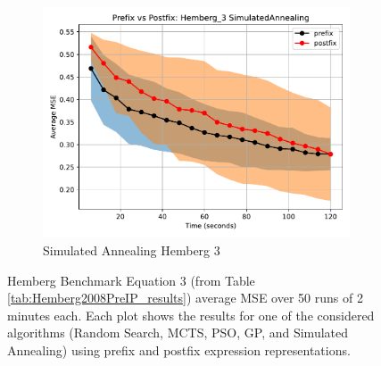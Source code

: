 \documentclass[runningheads]{llncs}
\begin{document}
\begin{figure}
    \vspace{0.5cm}
    
    \begin{subfigure}[b]{0.4\textwidth}
        \includegraphics[width=\linewidth, keepaspectratio]{Hemberg_Benchmarks/PrePostHemberg_3SimulatedAnnealing.pdf}
        \caption{Simulated Annealing Hemberg 3}
        \label{subfig:hemberg_3_SA}
    \end{subfigure}
    
    \caption{Hemberg Benchmark Equation 3 (from Table \ref{tab:Hemberg2008PreIP_results}) average MSE over 50 runs of 2 minutes each. Each plot shows the results for one of the considered algorithms (Random Search, MCTS, PSO, GP, and Simulated Annealing) using prefix and postfix expression representations.}
    \label{fig:Hemberg_3_Benchmarks}
\end{figure}
\end{document}
